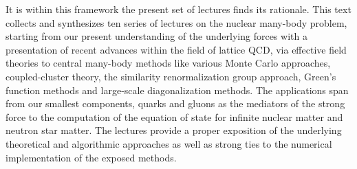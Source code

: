 It is within this framework the present set of lectures finds its rationale.
This text collects and synthesizes ten series of lectures on the
nuclear many-body problem, starting from our present understanding of
the underlying forces with a presentation of recent advances within
the field of lattice QCD, via effective field theories to central
many-body methods like various Monte Carlo approaches, coupled-cluster
theory, the similarity renormalization group approach, Green's
function methods and large-scale diagonalization methods.  The
applications span from our smallest components, quarks and gluons as
the mediators of the strong force to the computation of the equation
of state for infinite nuclear matter and neutron star matter.  The
lectures provide a proper exposition of the underlying theoretical and
algorithmic approaches as well as strong ties to the numerical
implementation of the exposed methods.  


